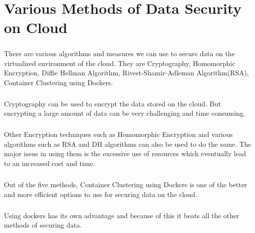 \chapter{Various Methods of Data Security on Cloud}
\paragraph{\hspace{24pt}}
There are various algorithms and measures we can use to secure data on the virtualized environment of the cloud. They are Cryptography, Homomorphic Encryption, Diffie Hellman Algorithm, Rivest-Shamir-Adleman Algorithm(RSA), Container Clustering using Dockers.

\paragraph{\hspace{24pt}}
Cryptography can be used to encrypt the data stored on the cloud. But encrypting a large amount of data can be very challenging and time consuming.

\paragraph{\hspace{24pt}}
Other Encryption techniques such as Homomorphic Encryption and various algorithms such as RSA and DH algorithms can also be used to do the same. The major issue in using them is the excessive use of resources which eventually lead to an increased cost and time.

\paragraph{\hspace{24pt}}
Out of the five methods, Container Clustering using Dockers is one of the better and more efficient options to use for securing data on the cloud.

\paragraph{\hspace{24pt}}
Using dockers has its own advantage and because of this it beats all the other methods of securing data.